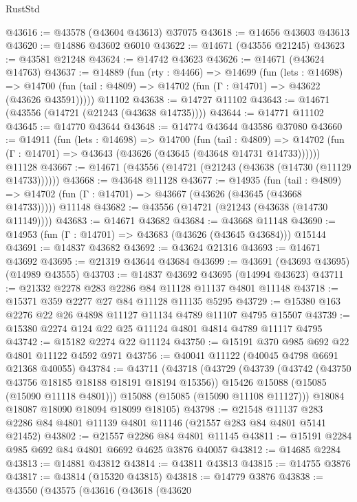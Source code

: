 \begin{lexlean}{RustStd}
\begin{coremodule}
@43616 := @43578 (@43604 @43613) @37075
@43618 := @14656 @43603 @43613
@43620 := @14886 @43602 @6010
@43622 := @14671 (@43556 @21245)
@43623 := @43581 @21248
@43624 := @14742 @43623
@43626 := @14671 (@43624 @14763)
@43637 := @14889
    (fun (rty : @4466) =>
    @14699
      (fun (lets : @14698) =>
      @14700 (fun (tail : @4809) => @14702 (fun (Γ : @14701) => @43622 (@43626 @43591)))))
    @11102
@43638 := @14727 @11102
@43643 := @14671 (@43556 (@14721 (@21243 (@43638 @14735))))
@43644 := @14771 @11102
@43645 := @14770 @43644
@43648 := @14774 @43644 @43586 @37080
@43660 := @14911
    (fun (lets : @14698) =>
    @14700
      (fun (tail : @4809) =>
      @14702 (fun (Γ : @14701) => @43643 (@43626 (@43645 (@43648 @14731 @14733))))))
    @11128
@43667 := @14671 (@43556 (@14721 (@21243 (@43638 (@14730 (@11129 @14733))))))
@43668 := @43648 @11128
@43677 := @14935
    (fun (tail : @4809) => @14702 (fun (Γ : @14701) => @43667 (@43626 (@43645 (@43668 @14733)))))
    @11148
@43682 := @43556 (@14721 (@21243 (@43638 (@14730 @11149))))
@43683 := @14671 @43682
@43684 := @43668 @11148
@43690 := @14953 (fun (Γ : @14701) => @43683 (@43626 (@43645 @43684))) @15144
@43691 := @14837 @43682
@43692 := @43624 @21316
@43693 := @14671 @43692
@43695 := @21319 @43644 @43684
@43699 := @43691 (@43693 @43695) (@14989 @43555)
@43703 := @14837 @43692 @43695 (@14994 @43623)
@43711 := @21332 @2278 @283 @2286 @84 @11128 @11137 @4801 @11148
@43718 := @15371 @359 @2277 @27 @84 @11128 @11135 @5295
@43729 := @15380 @163 @2276 @22 @26 @4898 @11127 @11134 @4789 @11107 @4795 @15507
@43739 := @15380 @2274 @124 @22 @25 @11124 @4801 @4814 @4789 @11117 @4795
@43742 := @15182 @2274 @22 @11124
@43750 := @15191 @370 @985 @692 @22 @4801 @11122 @4592 @971
@43756 := @40041 @11122 (@40045 @4798 @6691 @21368 @40055)
@43784 := @43711
    (@43718
      (@43729
        (@43739
          (@43742 (@43750 @43756 @18185 @18188 @18191 @18194 @15356))
          @15426
          @15088
          (@15085 (@15090 @11118 @4801)))
        @15088
        (@15085 (@15090 @11108 @11127)))
      @18084
      @18087
      @18090
      @18094
      @18099
      @18105)
@43798 := @21548
    @11137
    @283
    @2286
    @84
    @4801
    @11139
    @4801
    @11146
    (@21557 @283 @84 @4801 @5141 @21452)
@43802 := @21557 @2286 @84 @4801 @11145
@43811 := @15191 @2284 @985 @692 @84 @4801 @6692 @4625 @3876 @40057
@43812 := @14685 @2284
@43813 := @14881 @43812
@43814 := @43811 @43813
@43815 := @14755 @3876
@43817 := @43814 (@15320 @43815)
@43818 := @14779 @3876
@43838 := @43550
    (@43575
      (@43616
        (@43618
          (@43620

\end{coremodule}
\end{lexlean}
